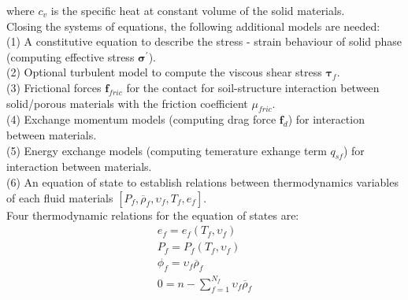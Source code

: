 \documentclass[preprint,12pt]{elsarticle}
\begin{document}
%
%
where $c_v$ is the specific heat at constant volume of the solid materials.
\underline{\hspace{5in}}\\
Closing the systems of equations, the following additional models are needed: \\
(1) A constitutive equation to describe the stress - strain behaviour of solid phase (computing effective stress $\pmb{\sigma}^\prime$). \\
(2) Optional turbulent model to compute the viscous shear stress $\pmb{\tau}_f$.\\
(3) Frictional forces $\pmb{f}_{fric}$ for the contact for soil-structure interaction between solid/porous materials with the friction coefficient $\mu_{fric}$. \\
(4) Exchange momentum models (computing drag force $\pmb{f}_{d}$) for interaction between materials. \\
(5) Energy exchange models (computing temerature exhange term $q_{sf}$) for interaction between materials. \\
(6) An equation of state to establish relations between thermodynamics variables of each fluid materials $[P_{f}, \overline{\rho}_f, \upsilon_f, T_f, e_f]$. \\
Four thermodynamic relations for the equation of states are:
%
%
\begin{equation}
\begin{gathered}
  e_f =  e_f (T_f, \upsilon_f)\\
 P_f =  P_f(T_f, \upsilon_f)\\
  \phi_f = \upsilon_f \overline{\rho}_f\\
  0 = n - \sum_{f=1}^{N_f} \upsilon_f \overline{\rho}_f\\
\end {gathered}
\end {equation}
%
%
\end{document}
